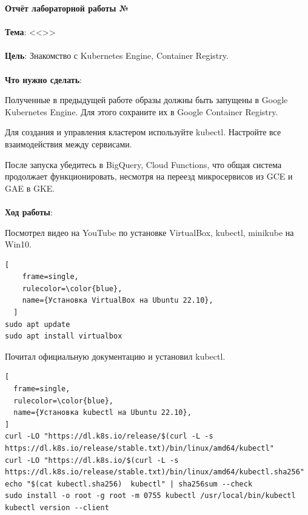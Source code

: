 \documentclass[12pt, a4paper, simple]{eskdtext}
\begin{document}
  

  \begin{center}
    \textbf{Отчёт лабораторной работы №\envReportLabNumber}
  \end{center}

  \paragraph{} \textbf{Тема}: <<\envReportTitle>>

  \paragraph{} \textbf{Цель}:
  Знакомство с Kubernetes Engine, Container Registry.

  \paragraph{} \textbf{Что нужно сделать}:

  Полученные в предыдущей работе образы должны быть запущены в Google Kubernetes Engine.
  Для этого сохраните их в Google Container Registry.

  Для создания и управления кластером используйте kubectl.
  Настройте все взаимодействия между сервисами.

  После запуска убедитесь в BigQuery, Cloud Functions, что общая система продолжает функционировать,
  несмотря на переезд микросервисов из GCE и GAE в GKE.

  \paragraph{} \textbf{{Ход работы}}:

  Посмотрел видео на YouTube \cite{kubernetes_install} по установке VirtualBox, kubectl, minikube на Win10.

  \begin{lstlisting}[
    frame=single,
    rulecolor=\color{blue},
    name={Установка VirtualBox на Ubuntu 22.10},
  ]
sudo apt update
sudo apt install virtualbox
\end{lstlisting}

  Почитал официальную документацию \cite{kubernetes_install_kubectl} и установил kubectl.

\begin{lstlisting}[
  frame=single,
  rulecolor=\color{blue},
  name={Установка kubectl на Ubuntu 22.10},
]
curl -LO "https://dl.k8s.io/release/$(curl -L -s https://dl.k8s.io/release/stable.txt)/bin/linux/amd64/kubectl"
curl -LO "https://dl.k8s.io/$(curl -L -s https://dl.k8s.io/release/stable.txt)/bin/linux/amd64/kubectl.sha256"
echo "$(cat kubectl.sha256)  kubectl" | sha256sum --check
sudo install -o root -g root -m 0755 kubectl /usr/local/bin/kubectl
kubectl version --client
\end{lstlisting}
\end{document}
